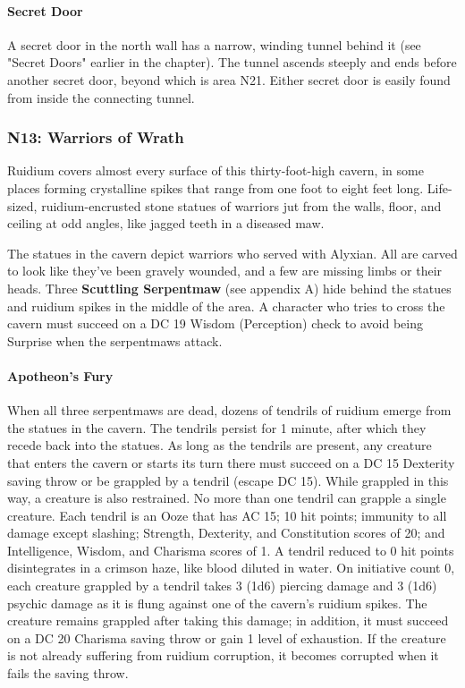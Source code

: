 \documentclass[10pt,a4,twoside,twocolumn,openany,nodeprecatedcode]{dndbook}
\begin{document}
\paragraph{Secret Door}
A secret door in the north wall has a narrow, winding tunnel behind it (see "Secret Doors" earlier in the chapter). The tunnel ascends steeply and ends before another secret door, beyond which is area N21. Either secret door is easily found from inside the connecting tunnel.
\subsubsection{N13: Warriors of Wrath}
\begin{DndReadAloud}{}
Ruidium covers almost every surface of this thirty-foot-high cavern, in some places forming crystalline spikes that range from one foot to eight feet long. Life-sized, ruidium-encrusted stone statues of warriors jut from the walls, floor, and ceiling at odd angles, like jagged teeth in a diseased maw.
\end{DndReadAloud}

The statues in the cavern depict warriors who served with Alyxian. All are carved to look like they've been gravely wounded, and a few are missing limbs or their heads.
Three \textbf{Scuttling Serpentmaw} (see appendix A) hide behind the statues and ruidium spikes in the middle of the area. A character who tries to cross the cavern must succeed on a DC 19 Wisdom (Perception) check to avoid being Surprise when the serpentmaws attack.
\paragraph{Apotheon's Fury}
When all three serpentmaws are dead, dozens of tendrils of ruidium emerge from the statues in the cavern. The tendrils persist for 1 minute, after which they recede back into the statues.
As long as the tendrils are present, any creature that enters the cavern or starts its turn there must succeed on a DC 15 Dexterity saving throw or be grappled by a tendril (escape DC 15). While grappled in this way, a creature is also restrained. No more than one tendril can grapple a single creature. Each tendril is an Ooze that has AC 15; 10 hit points; immunity to all damage except slashing; Strength, Dexterity, and Constitution scores of 20; and Intelligence, Wisdom, and Charisma scores of 1. A tendril reduced to 0 hit points disintegrates in a crimson haze, like blood diluted in water.
On initiative count 0, each creature grappled by a tendril takes 3 (1d6) piercing damage and 3 (1d6) psychic damage as it is flung against one of the cavern's ruidium spikes. The creature remains grappled after taking this damage; in addition, it must succeed on a DC 20 Charisma saving throw or gain 1 level of exhaustion. If the creature is not already suffering from ruidium corruption, it becomes corrupted when it fails the saving throw.
\end{document}
